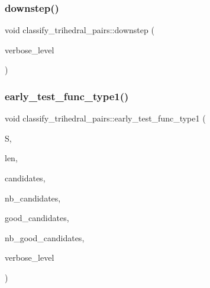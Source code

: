 \mbox{\label{classclassify__trihedral__pairs_a3fe3880b4f1451c976300cba97be0bbf}} 
\subsubsection{\texorpdfstring{downstep()}{downstep()}}
{\footnotesize\ttfamily void classify\+\_\+trihedral\+\_\+pairs\+::downstep (\begin{DoxyParamCaption}\item[{\mbox{\hyperlink{galois_8h_a09fddde158a3a20bd2dcadb609de11dc}{I\+NT}}}]{verbose\+\_\+level }\end{DoxyParamCaption})}

\mbox{\label{classclassify__trihedral__pairs_adf640c2ef73e67f912395e71318ceab8}} 
\subsubsection{\texorpdfstring{early\+\_\+test\+\_\+func\+\_\+type1()}{early\_test\_func\_type1()}}
{\footnotesize\ttfamily void classify\+\_\+trihedral\+\_\+pairs\+::early\+\_\+test\+\_\+func\+\_\+type1 (\begin{DoxyParamCaption}\item[{\mbox{\hyperlink{galois_8h_a09fddde158a3a20bd2dcadb609de11dc}{I\+NT}} $\ast$}]{S,  }\item[{\mbox{\hyperlink{galois_8h_a09fddde158a3a20bd2dcadb609de11dc}{I\+NT}}}]{len,  }\item[{\mbox{\hyperlink{galois_8h_a09fddde158a3a20bd2dcadb609de11dc}{I\+NT}} $\ast$}]{candidates,  }\item[{\mbox{\hyperlink{galois_8h_a09fddde158a3a20bd2dcadb609de11dc}{I\+NT}}}]{nb\+\_\+candidates,  }\item[{\mbox{\hyperlink{galois_8h_a09fddde158a3a20bd2dcadb609de11dc}{I\+NT}} $\ast$}]{good\+\_\+candidates,  }\item[{\mbox{\hyperlink{galois_8h_a09fddde158a3a20bd2dcadb609de11dc}{I\+NT}} \&}]{nb\+\_\+good\+\_\+candidates,  }\item[{\mbox{\hyperlink{galois_8h_a09fddde158a3a20bd2dcadb609de11dc}{I\+NT}}}]{verbose\+\_\+level }\end{DoxyParamCaption})}


